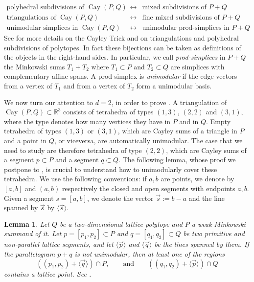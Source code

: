 \documentclass{amsart}
\theoremstyle{plain}
\newtheorem{lemma}[theorem]{Lemma}
\theoremstyle{definition}
\newcommand{\R}{ \ensuremath{\mathbb{R}}}
\renewcommand{\int}{\operatorname{int}}
\renewcommand{\vec}[1]{\overrightarrow#1}
\newcommand{\vecline}[1]{\langle \vec #1 \rangle}
\newcommand{\cayley}{\operatorname{Cay}}
\newcommand{\paco}[1]{\todo[size=\tiny,color=green!30]{#1 \\ \hfill --- P.}}
\begin{document}
\[
\begin{array}{ccc}
\text{polyhedral subdivisions of $\cayley(P,Q)$} &\leftrightarrow& \text{mixed subdivisions of $P + Q$}\\
\text{triangulations of $\cayley(P,Q)$} &\leftrightarrow& \text{fine mixed subdivisions of $P + Q$}\\
\text{unimodular simplices in $\cayley(P,Q)$} &\leftrightarrow& \text{unimodular prod-simplices in $P + Q$}.
\end{array}
\]
See \cite{DLRS2010} for more details on the Cayley Trick and on triangulations and polyhedral subdivisions of polytopes.
In fact these bijections can be taken as definitions of the objects in the right-hand sides. In particular, 
we call \emph{prod-simplices} in $P+Q$ the Minkowski sums $T_1+T_2$ where $T_1\subset P$ and $T_2\subset Q$ are simplices with complementary affine spans. A prod-simplex is \emph{unimodular} if the edge vectors from a vertex of $T_1$ and from a vertex of $T_2$ form a unimodular basis.

\medskip

We now turn our attention to $d=2$, in order to prove . A triangulation of $\cayley(P,Q)\subset \R^3$ consists of tetrahedra of types $(1,3)$, $(2,2)$ and $(3,1)$, where the type denotes how many vertices they have in $P$ and in $Q$. Empty tetrahedra of types $(1,3)$ or $(3,1)$, which are Cayley sums of a triangle in $P$ and a point in $Q$, or viceversa, are automatically unimodular. The case that we need to study are therefore tetrahedra of type $(2,2)$, which are Cayley sums of a segment $p\subset P$ and a segment $q\subset Q$.
The following lemma, whose proof we postpone to , is crucial to understand how to unimodularly cover these tetrahedra. 
We use the following conventions: if $a, b$ are points, we denote by $[a,b]$ and $(a,b)$ respectively the closed and open segments with endpoints $a,b$. Given a segment $s=[a,b]$, we denote the vector $\vec s:= b-a$ and  the line spanned by $\vec s$ by $\vecline s$.

\begin{lemma}
\label{lemma:cayley}
Let $Q$ be a two-dimensional lattice polytope and $P$ a weak Minkowski summand of it. 
Let $p=[p_1,p_2] \subset P$ and $q=[q_1,q_2]\subset Q$ be two primitive and non-parallel lattice segments, and let $\vecline p$ and $ \vecline q$ be the lines spanned by them.  If the parallelogram $p + q$ is not unimodular, then at least one of the regions
\[
((p_1, p_2) + \vecline q ) \cap P, 
\qquad \text{and} \qquad
((q_1, q_2) + \vecline p ) \cap Q
\]
contains a lattice point. See .
\end{lemma}
\end{document}
